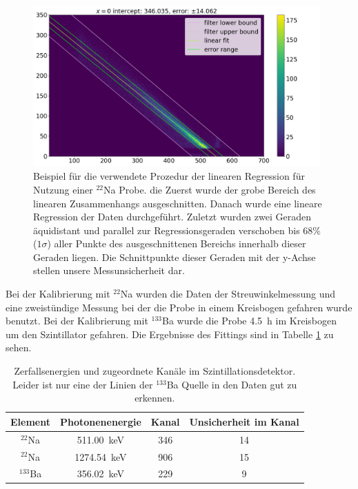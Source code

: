 \begin{figure}[ht]
	\centering
    \includegraphics[width=0.98\textwidth]{images/kali_szint_fit_Na22.png}
	\caption{Beispiel für die verwendete Prozedur der linearen Regression für Nutzung einer $^{22}$Na Probe. die Zuerst wurde der grobe Bereich des linearen Zusammenhangs ausgeschnitten. Danach wurde eine lineare Regression der Daten durchgeführt. Zuletzt wurden zwei Geraden äquidistant und parallel zur Regressionsgeraden verschoben bis $ 68 \% $ ($1 \sigma$) aller Punkte des ausgeschnittenen Bereichs innerhalb dieser Geraden liegen. Die Schnittpunkte dieser Geraden mit der y-Achse stellen unsere Messunsicherheit dar.}
	\label{kali_szint_bsp_fit}
\end{figure}

Bei der Kalibrierung mit $^{22}$Na wurden die Daten der Streuwinkelmessung und eine zweistündige Messung bei der die Probe in einem Kreisbogen gefahren wurde benutzt. Bei der Kalibrierung mit $^{133}$Ba wurde die Probe \SI{4.5}{\hour} im Kreisbogen um den Szintillator gefahren. Die Ergebnisse des Fittings sind in Tabelle \ref{kali_szint_Energien} zu sehen.

\begin{table}[h]
    \centering
    \begin{tabular}{|c | c | c | c|}
        \hline
        Element & Photonenenergie & Kanal & Unsicherheit im Kanal \\
        \hline
        $^{22}$Na & \SI{511.00}{\kilo\electronvolt} & 346 & 14 \\
        $^{22}$Na & \SI{1274.54}{\kilo\electronvolt} & 906 & 15 \\
        $^{133}$Ba & \SI{356.02}{\kilo\electronvolt} & 229 & 9 \\
        \hline
    \end{tabular}
    \caption{Zerfallsenergien und zugeordnete Kanäle im Szintillationsdetektor. Leider ist nur eine der Linien der $^{133}$Ba Quelle in den Daten gut zu erkennen.}
    \label{kali_szint_Energien}
\end{table}

